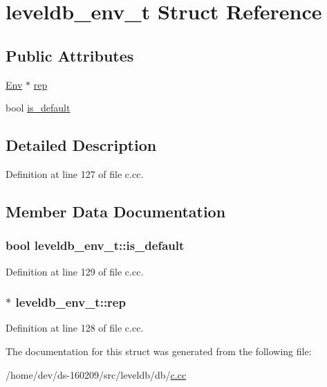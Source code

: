 \hypertarget{structleveldb__env__t}{}\section{leveldb\+\_\+env\+\_\+t Struct Reference}
\label{structleveldb__env__t}
\subsection*{Public Attributes}
\begin{DoxyCompactItemize}
\item 
\hyperlink{classleveldb_1_1_env}{Env} $\ast$ \hyperlink{structleveldb__env__t_ad41038b41aebaf7ffba1a4bbfaa8b539}{rep}
\item 
bool \hyperlink{structleveldb__env__t_a53e285385a628e932128aec1f0fe1dae}{is\+\_\+default}
\end{DoxyCompactItemize}


\subsection{Detailed Description}


Definition at line 127 of file c.\+cc.



\subsection{Member Data Documentation}
\hypertarget{structleveldb__env__t_a53e285385a628e932128aec1f0fe1dae}{}
\subsubsection[{is\+\_\+default}]{\setlength{\rightskip}{0pt plus 5cm}bool leveldb\+\_\+env\+\_\+t\+::is\+\_\+default}\label{structleveldb__env__t_a53e285385a628e932128aec1f0fe1dae}


Definition at line 129 of file c.\+cc.

\hypertarget{structleveldb__env__t_ad41038b41aebaf7ffba1a4bbfaa8b539}{}
\subsubsection[{rep}]{$\ast$ leveldb\+\_\+env\+\_\+t\+::rep}\label{structleveldb__env__t_ad41038b41aebaf7ffba1a4bbfaa8b539}


Definition at line 128 of file c.\+cc.



The documentation for this struct was generated from the following file\+:\begin{DoxyCompactItemize}
\item 
/home/dev/ds-\/160209/src/leveldb/db/\hyperlink{c_8cc}{c.\+cc}\end{DoxyCompactItemize}
